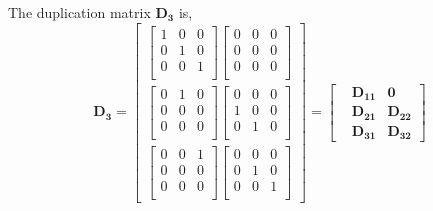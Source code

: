 \documentclass{article}
\begin{document}
The duplication matrix $\mathbf{D_3}$ is,
\begin{equation}
\mathbf{D_3}=
\begin{bmatrix}
\left[ \begin{array}{ccc}
1 &0 &0 \\
0 &1 &0 \\
0 &0 &1 \\
\end{array} \right]
\left[ \begin{array}{ccc}
0 &0 &0 \\
0 &0 &0 \\
0 &0 &0 \\
\end{array} \right] \\[15pt]
\left[ \begin{array}{ccc}
0 &1 &0 \\
0 &0 &0 \\
0 &0 &0 \\
\end{array} \right] 
\left[ \begin{array}{ccc}
0 &0 &0 \\
1 &0 &0 \\
0 &1 &0 \\
\end{array} \right] \\[15pt]
\left[ \begin{array}{ccc}
0 &0 &1 \\
0 &0 &0 \\
0 &0 &0 \\
\end{array} \right]
\left[ \begin{array}{ccc}
0 &0 &0 \\
0 &1 &0 \\
0 &0 &1 \\
\end{array} \right]
\end{bmatrix}=
\begin{bmatrix}
&\mathbf{D_{11}} &\mathbf{0}  \\
&\mathbf{D_{21}} &\mathbf{D_{22}}  \\
&\mathbf{D_{31}} &\mathbf{D_{32}}
\end{bmatrix}
\end{equation}
\end{document}
